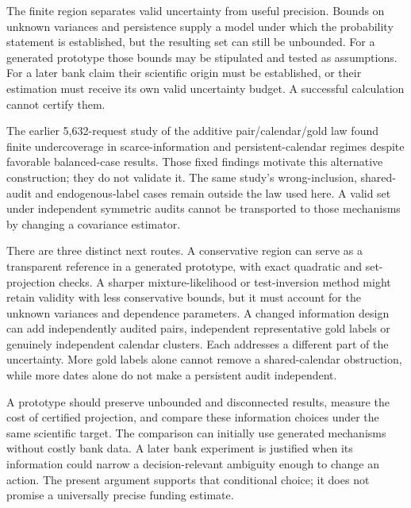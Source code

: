The finite region separates valid uncertainty from useful precision.
Bounds on unknown variances and persistence supply a model under which
the probability statement is established, but the resulting set can
still be unbounded. For a generated prototype those bounds may be
stipulated and tested as assumptions. For a later bank claim their
scientific origin must be established, or their estimation must receive
its own valid uncertainty budget. A successful calculation cannot
certify them.

The earlier 5,632-request study of the additive pair/calendar/gold law
found finite undercoverage in scarce-information and persistent-calendar
regimes despite favorable balanced-case results. Those fixed findings
motivate this alternative construction; they do not validate it. The
same study's wrong-inclusion, shared-audit and endogenous-label cases
remain outside the law used here. A valid set under independent
symmetric audits cannot be transported to those mechanisms by changing a
covariance estimator. \citep{exec13_persistent_predecessor}

There are three distinct next routes. A conservative region can serve as
a transparent reference in a generated prototype, with exact quadratic
and set-projection checks. A sharper mixture-likelihood or
test-inversion method might retain validity with less conservative
bounds, but it must account for the unknown variances and dependence
parameters. A changed information design can add independently audited
pairs, independent representative gold labels or genuinely independent
calendar clusters. Each addresses a different part of the uncertainty.
More gold labels alone cannot remove a shared-calendar obstruction,
while more dates alone do not make a persistent audit independent.

A prototype should preserve unbounded and disconnected results, measure
the cost of certified projection, and compare these information choices
under the same scientific target. The comparison can initially use
generated mechanisms without costly bank data. A later bank experiment
is justified when its information could narrow a decision-relevant
ambiguity enough to change an action. The present argument supports that
conditional choice; it does not promise a universally precise funding
estimate. \label{exec13:persistent-region-end}
